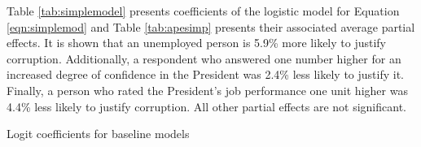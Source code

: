 \documentclass[12pt,a4]{article}\usepackage[]{graphicx}\usepackage[]{xcolor}
\begin{document}
Table \ref{tab:simplemodel} presents coefficients of the logistic model for Equation \ref{eqn:simplemod} and Table \ref{tab:apesimp} presents their associated average partial effects. It is shown that an unemployed person is 5.9\% more likely to justify corruption. Additionally, a respondent who answered one number higher for an increased degree of confidence in the President was 2.4\% less likely to justify it. Finally, a person who rated the President's job performance one unit higher was 4.4\% less likely to justify corruption. All other partial effects are not significant.

\begin{table}[htbp!]
\caption{Logit coefficients for baseline models}
\label{tab:simplemodel}


\end{table}
\end{document}
